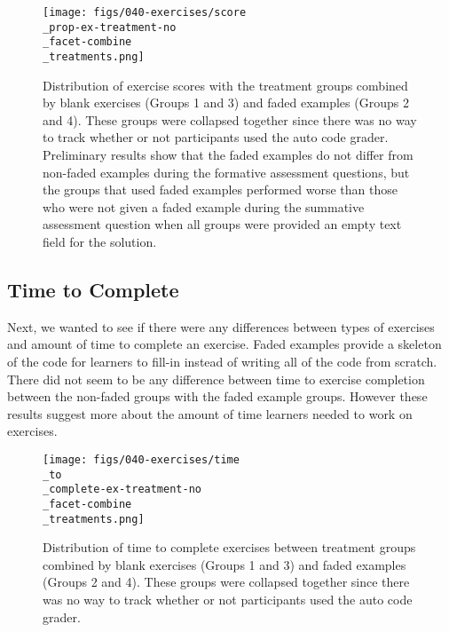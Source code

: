 \documentclass[040-assessment.tex]{subfiles}
\begin{document}
    \begin{figure}[htb]
        \centering
        \texttt{[image: figs/040-exercises/score\\\_prop-ex-treatment-no\\\_facet-combine\\\_treatments.png]}
        \caption[Graded Exercise Scores with combined treatment groups]
        {Distribution of exercise scores with the treatment groups combined by
        blank exercises (Groups 1 and 3) and faded examples (Groups 2 and 4).
        These groups were collapsed together since there was no way to track whether or not
        participants used the auto code grader.
        Preliminary results show that the faded examples do not differ from non-faded examples during
        the formative assessment questions,
        but the groups that used faded examples performed worse than those who were not given a faded example
        during the summative assessment question when all groups were provided an empty text field for the solution.
        }
        \label{fig:exercise-scores-combined-treatments}
    \end{figure}

\subsection{Time to Complete}

    Next, we wanted to see if there were any differences between types of exercises and amount of time to complete an exercise.
    Faded examples provide a skeleton of the code for learners to fill-in instead of writing all of the code from scratch.
    There did not seem to be any difference between time to exercise completion between the non-faded groups with the
    faded example groups.
    However these results suggest more about the amount of time learners needed to work on exercises.

    \begin{figure}[htb]
        \centering
        \texttt{[image: figs/040-exercises/time\\\_to\\\_complete-ex-treatment-no\\\_facet-combine\\\_treatments.png]}
        \caption[Time to complete exercises with combined treatment groups]
        {Distribution of time to complete exercises between treatment groups combined by
        blank exercises (Groups 1 and 3) and faded examples (Groups 2 and 4).
        These groups were collapsed together since there was no way to track whether or not
        participants used the auto code grader.
        }
        \label{fig:time-to-complete-combined-treatments}
    \end{figure}
\end{document}
